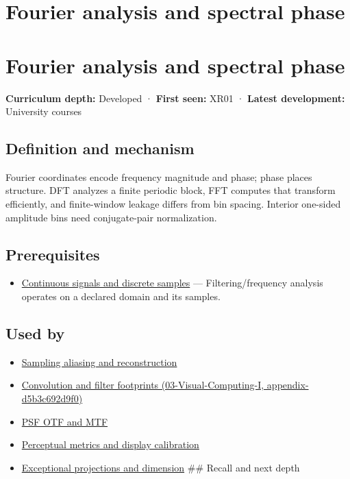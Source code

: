 \hypertarget{appendix-b60686ba06a1}{}
\section*{Fourier analysis and spectral phase}
\section{Fourier analysis and spectral phase}\label{fourier-analysis-and-spectral-phase}

\textbf{Curriculum depth:} Developed · \textbf{First seen:} XR01 · \textbf{Latest development:} University courses

\subsection{Definition and mechanism}\label{definition-and-mechanism}

Fourier coordinates encode frequency magnitude and phase; phase places structure. DFT analyzes a finite periodic block, FFT computes that transform efficiently, and finite-window leakage differs from bin spacing. Interior one-sided amplitude bins need conjugate-pair normalization.

\subsection{Prerequisites}\label{prerequisites}

\begin{itemize}
\tightlist
\item
  \hyperref[appendix-1077ea8fc737]{Continuous signals and discrete samples} --- Filtering/frequency analysis operates on a declared domain and its samples.
\end{itemize}

\subsection{Used by}\label{used-by}

\begin{itemize}
\item
  \hyperref[appendix-6a7869dd79a6]{Sampling aliasing and reconstruction}
\item
  \href{}{Convolution and filter footprints (03-Visual-Computing-I, appendix-d5b3c692d9f0)}
\item
  \hyperref[appendix-8b76b0efd27f]{PSF OTF and MTF}
\item
  \hyperref[appendix-b2c1846508bf]{Perceptual metrics and display calibration}
\item
  \hyperref[appendix-3c73f7862157]{Exceptional projections and dimension} \#\# Recall and next depth
\end{itemize}


